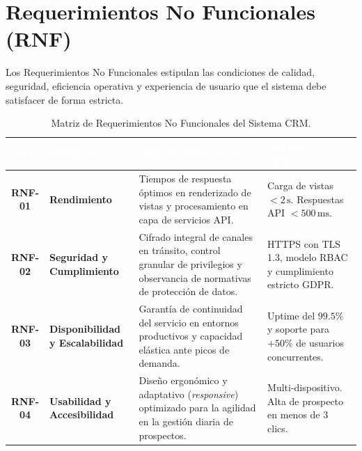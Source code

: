 \newpage
\section{Requerimientos No Funcionales (RNF)}

Los Requerimientos No Funcionales estipulan las condiciones de calidad, seguridad, eficiencia operativa y experiencia de usuario que el sistema debe satisfacer de forma estricta.

\vspace{0.3cm}
\begin{table}[h]
    \centering
    \sffamily\small
    \renewcommand{\arraystretch}{1.4}
    \begin{tabularx}{\textwidth}{c >{\raggedright\arraybackslash}p{2.8cm} >{\raggedright\arraybackslash}X >{\raggedright\arraybackslash}p{3.8cm}}
        \toprule
        \rowcolor{PrimaryNavy}
        \textcolor{white}{\textbf{ID}} & 
        \textcolor{white}{\textbf{Categoría}} & 
        \textcolor{white}{\textbf{Especificación Técnica}} & 
        \textcolor{white}{\textbf{Métrica / Criterio}} \\
        \midrule
        \rowcolor{BgSoftGray}
        \textbf{RNF-01} & 
        \textbf{Rendimiento} & 
        Tiempos de respuesta óptimos en renderizado de vistas y procesamiento en capa de servicios API. & 
        Carga de vistas $< 2\,\text{s}$. \newline Respuestas API $< 500\,\text{ms}$. \\
        
        \textbf{RNF-02} & 
        \textbf{Seguridad y Cumplimiento} & 
        Cifrado integral de canales en tránsito, control granular de privilegios y observancia de normativas de protección de datos. & 
        HTTPS con TLS 1.3, modelo RBAC y cumplimiento estricto GDPR. \\
        
        \rowcolor{BgSoftGray}
        \textbf{RNF-03} & 
        \textbf{Disponibilidad y Escalabilidad} & 
        Garantía de continuidad del servicio en entornos productivos y capacidad elástica ante picos de demanda. & 
        Uptime del $99.5\%$ y soporte para $+50\%$ de usuarios concurrentes. \\
        
        \textbf{RNF-04} & 
        \textbf{Usabilidad y Accesibilidad} & 
        Diseño ergonómico y adaptativo (\textit{responsive}) optimizado para la agilidad en la gestión diaria de prospectos. & 
        Multi-dispositivo. Alta de prospecto en menos de $3$ clics. \\
        \bottomrule
    \end{tabularx}
    \caption{Matriz de Requerimientos No Funcionales del Sistema CRM.}
    \label{tab:rnf}
\end{table}

\vspace{0.5cm}
